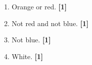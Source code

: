 \documentclass[a4paper, leqno, 12pt]{article} %
\newenvironment{top_enumerate}{
\begin{enumerate}
  \setlength{\itemsep}{2em}
  \setlength{\topsep}{-0pt}
  \setlength{\partopsep}{-0pt}
}{\end{enumerate}}
\begin{document}
\begin{top_enumerate}
\setcounter{equation}{0}  %
\begin{enumerate}
	\setlength{\topsep}{-0pt}
	\setlength{\partopsep}{-0pt}
	\setlength{\itemsep}{10pt}
			\item Orange or red.
	 \quad \textbf{[1]}
		\item Not red and not blue.
	 \quad \textbf{[1]}
		\item Not blue.
	 \quad \textbf{[1]}
		\item White.
	 \quad \textbf{[1]}
\end{enumerate}

\end{top_enumerate}

\bigskip
\section*{}
\end{document}
